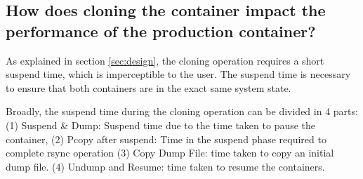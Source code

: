 \subsection{How does cloning the container impact the performance of the production container?}
\label{sec:performance}

As explained in section \ref{sec:design}, the cloning operation requires a short suspend time, which is imperceptible to the user.
The suspend time is necessary to ensure that both containers are in the exact same system state.

Broadly, the suspend time during the cloning operation can be divided in 4 parts: 
(1) Suspend \& Dump: Suspend time due to the time taken to pause the container, 
(2) Pcopy after suspend: Time in the suspend phase required to complete rsync operation 
(3) Copy Dump File: time taken to copy an initial dump file.
(4) Undump and Resume: time taken to resume the containers. 

